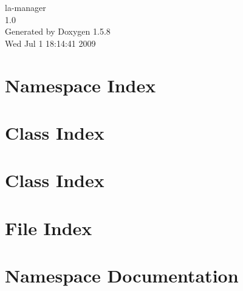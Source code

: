 \documentclass[a4paper]{book}
\begin{document}
\begin{titlepage}
\vspace*{7cm}
\begin{center}
{\Large la-manager \\[1ex]\large 1.0 }\\
\vspace*{1cm}
{\large Generated by Doxygen 1.5.8}\\
\vspace*{0.5cm}
{\small Wed Jul 1 18:14:41 2009}\\
\end{center}
\end{titlepage}
\clearemptydoublepage
{}
\tableofcontents
\clearemptydoublepage
{}
\chapter{Namespace Index}

\chapter{Class Index}

\chapter{Class Index}

\chapter{File Index}

\chapter{Namespace Documentation}



\end{document}
